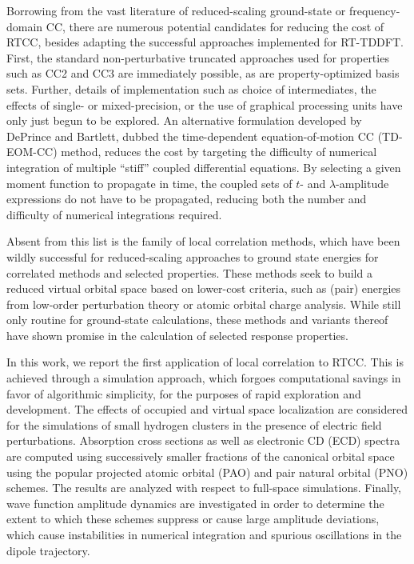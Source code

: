 Borrowing from the vast literature of reduced-scaling ground-state or
frequency-domain CC, there are numerous potential candidates for reducing the
cost of RTCC, besides adapting the successful approaches implemented for RT-TDDFT.
First, the standard non-perturbative truncated approaches used
for properties such as CC2\cite{Christiansen1995} and CC3\cite{Koch1997}
are immediately possible, as are property-optimized basis sets.
\cite{Wolinski1990,Sadlej1977,Roos1985,Sadlej1991a,Benkova2005,Baranowska2010,Baranowska2013,Aharon2020a,Howard2018}
Further, details of implementation such as choice of intermediates, the
effects of single- or mixed-precision, or the use of graphical processing
units have only just begun to be explored. \cite{Wang2022} 
An alternative formulation developed by DePrince and Bartlett, 
dubbed the time-dependent equation-of-motion CC (TD-EOM-CC)
\cite{Nascimento2016,Nascimento2017,Nascimento2019,Park2019,Park2021b}
method, reduces the cost by targeting the difficulty of
numerical integration of multiple ``stiff'' coupled differential
equations. By selecting a given moment function to propagate in time,
the coupled sets of $t$- and $\lambda$-amplitude expressions do
not have to be propagated, reducing both the number and difficulty
of numerical integrations required. 

Absent from this list is the family of local correlation methods,\cite{Werner2006}
which have been wildly successful for reduced-scaling approaches to
ground state energies for correlated methods and selected properties.
\cite{Crawford2019,Aharon2020a,DCunha2021,Kodrycka2022} These methods seek to
build a reduced virtual orbital space based on lower-cost criteria, such
as (pair) energies from low-order perturbation theory or atomic orbital
charge analysis. While still only routine for ground-state calculations,
these methods and variants thereof have shown promise in the calculation
of selected response properties.

In this work, we report the first application of local correlation to 
RTCC. This is achieved through a simulation approach,\cite{Hampel1996} 
which forgoes computational savings in favor of algorithmic simplicity, 
for the purposes of rapid exploration and development. 
The effects of occupied and virtual space localization are considered for the simulations of small
hydrogen clusters in the presence of electric field perturbations. Absorption cross sections as
well as electronic CD (ECD) spectra are computed using successively smaller fractions of the canonical
orbital space using the popular 
projected atomic orbital (PAO)
\cite{Pulay1983,Saebo1985,Saebo1986,Saebo1993}
and pair natural orbital (PNO)
\cite{Neese2009,Neese2009a}
schemes. The results are analyzed with respect to full-space simulations. 
Finally, wave function amplitude dynamics are investigated
in order to determine the extent to which these schemes suppress or cause large amplitude 
deviations, which cause instabilities in numerical integration and spurious oscillations in the 
dipole trajectory.
